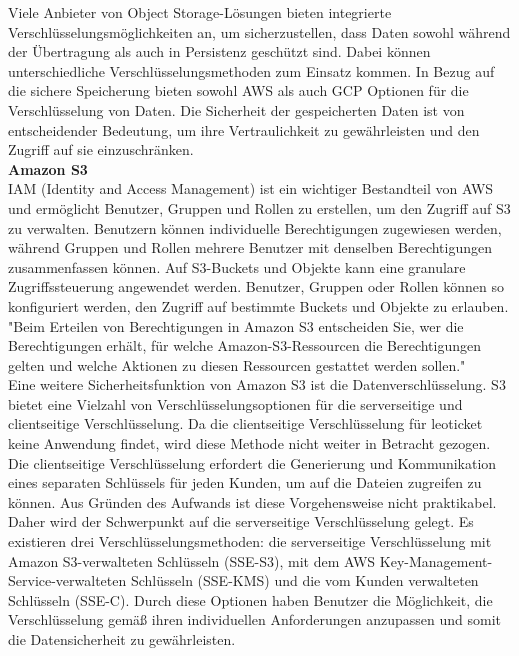 Viele Anbieter von Object Storage-Lösungen bieten integrierte Verschlüsselungsmöglichkeiten an, um sicherzustellen, dass Daten sowohl während der Übertragung als auch in Persistenz geschützt sind. Dabei können unterschiedliche Verschlüsselungsmethoden zum Einsatz kommen. In Bezug auf die sichere Speicherung bieten sowohl AWS als auch GCP Optionen für die Verschlüsselung von Daten. Die Sicherheit der gespeicherten Daten ist von entscheidender Bedeutung, um ihre Vertraulichkeit zu gewährleisten und den Zugriff auf sie einzuschränken.\\

\textbf{Amazon S3}\\

IAM (Identity and Access Management) ist ein wichtiger Bestandteil von AWS und ermöglicht Benutzer, Gruppen und Rollen zu erstellen, um den Zugriff auf S3 zu verwalten. Benutzern können individuelle Berechtigungen zugewiesen werden, während Gruppen und Rollen mehrere Benutzer mit denselben Berechtigungen zusammenfassen können. Auf S3-Buckets und Objekte kann eine granulare Zugriffssteuerung angewendet werden. Benutzer, Gruppen oder Rollen können so konfiguriert werden, den Zugriff auf bestimmte Buckets und Objekte zu erlauben. "Beim Erteilen von Berechtigungen in Amazon S3 entscheiden Sie, wer die Berechtigungen erhält, für welche Amazon-S3-Ressourcen die Berechtigungen gelten und welche Aktionen zu diesen Ressourcen gestattet werden sollen."\cite{aws-iam-s3}\\

Eine weitere Sicherheitsfunktion von Amazon S3 ist die Datenverschlüsselung. S3 bietet eine Vielzahl von Verschlüsselungsoptionen für die serverseitige und clientseitige Verschlüsselung. Da die clientseitige Verschlüsselung für leoticket keine Anwendung findet, wird diese Methode nicht weiter in Betracht gezogen. Die clientseitige Verschlüsselung erfordert die Generierung und Kommunikation eines separaten Schlüssels für jeden Kunden, um auf die Dateien zugreifen zu können. Aus Gründen des Aufwands ist diese Vorgehensweise nicht praktikabel. Daher wird der Schwerpunkt auf die serverseitige Verschlüsselung gelegt. Es existieren drei Verschlüsselungsmethoden: die serverseitige Verschlüsselung mit Amazon S3-verwalteten Schlüsseln (SSE-S3), mit dem AWS Key-Management-Service-verwalteten Schlüsseln (SSE-KMS) und die vom Kunden verwalteten Schlüsseln (SSE-C). Durch diese Optionen haben Benutzer die Möglichkeit, die Verschlüsselung gemäß ihren individuellen Anforderungen anzupassen und somit die Datensicherheit zu gewährleisten.\\

